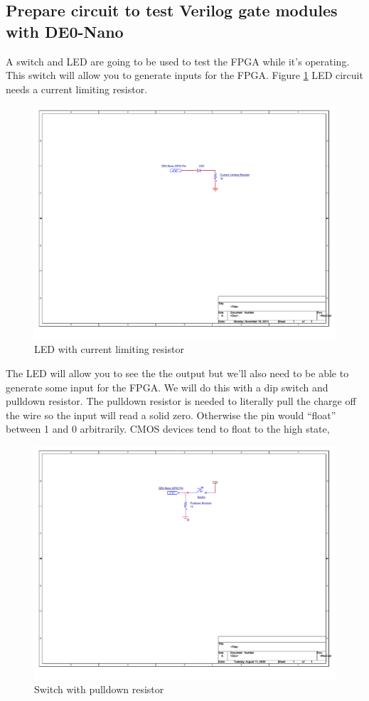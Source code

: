     \subsection{Prepare circuit to test Verilog gate modules with DE0-Nano}
      A switch and LED are going to be used to test the FPGA while it's operating. This switch will allow you to generate inputs for the FPGA. Figure \ref{LEDCircuit} LED circuit needs a current limiting resistor.
      \begin{figure}[htpb]
        \label{LEDCircuit}
        \includegraphics[width=.48\textwidth]{Schematics/LED.pdf}
        \caption{LED with current limiting resistor}
      \end{figure}
      The LED will allow you to see the the output but we'll also need to be able to generate some input for the FPGA. We will do this with a dip switch and pulldown resistor. The pulldown resistor is needed to literally pull the charge off the wire so the input will read a solid zero. Otherwise the pin would ``float'' between 1 and 0 arbitrarily. CMOS devices tend to float to the high state, 

      \begin{figure}[htpb]
        \label{swPulldown}
        \includegraphics[width=.38\textwidth]{Schematics/SwitchCircuit.pdf}
        \caption{Switch with pulldown resistor}
      \end{figure}

